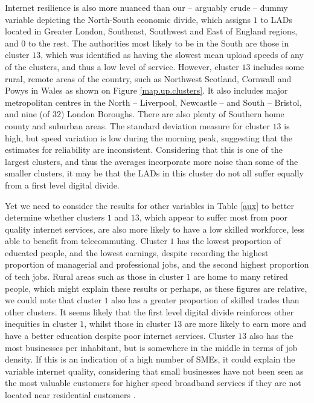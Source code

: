 \documentclass[Royal,times,sageh]{sagej}
\begin{document}
Internet resilience is also more nuanced than our -- arguably crude --
dummy variable depicting the North-South economic divide, which assigns
\(1\) to LADs located in Greater London, Southeast, Southwest and East
of England regions, and \(0\) to the rest. The authorities most likely
to be in the South are those in cluster \(13\), which was identified as
having the slowest mean upload speeds of any of the clusters, and thus a
low level of service. However, cluster \(13\) includes some rural,
remote areas of the country, such as Northwest Scotland, Cornwall and
Powys in Wales as shown on Figure \ref{map.up.clusters}. It also
includes major metropolitan centres in the North -- Liverpool, Newcastle
-- and South -- Bristol, and nine (of \(32\)) London Boroughs. There are
also plenty of Southern home county and suburban areas. The standard
deviation measure for cluster \(13\) is high, but speed variation is low
during the morning peak, suggesting that the estimates for reliability
are inconsistent. Considering that this is one of the largest clusters,
and thus the averages incorporate more noise than some of the smaller
clusters, it may be that the LADs in this cluster do not all suffer
equally from a first level digital divide.

Yet we need to consider the results for other variables in Table
\ref{aux} to better determine whether clusters \(1\) and \(13\), which
appear to suffer most from poor quality internet services, are also more
likely to have a low skilled workforce, less able to benefit from
telecommuting. Cluster \(1\) has the lowest proportion of educated
people, and the lowest earnings, despite recording the highest
proportion of managerial and professional jobs, and the second highest
proportion of tech jobs. Rural areas such as those in cluster \(1\) are
home to many retired people, which might explain these results or
perhaps, as these figures are relative, we could note that cluster \(1\)
also has a greater proportion of skilled trades than other clusters. It
seems likely that the first level digital divide reinforces other
inequities in cluster \(1\), whilst those in cluster \(13\) are more
likely to earn more and have a better education despite poor internet
services. Cluster \(13\) also has the most businesses per inhabitant,
but is somewhere in the middle in terms of job density. If this is an
indication of a high number of SMEs, it could explain the variable
internet quality, considering that small businesses have not been seen
as the most valuable customers for higher speed broadband services if
they are not located near residential customers \citep{ofcom2016}.
\end{document}
